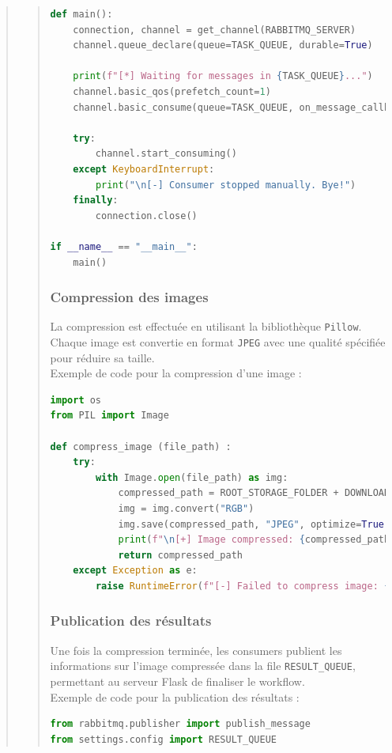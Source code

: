 \documentclass[12pt]{article}
\begin{document}
\begin{quote}
\begin{quote}
\begin{lstlisting}[language=Python]
def main():
    connection, channel = get_channel(RABBITMQ_SERVER)
    channel.queue_declare(queue=TASK_QUEUE, durable=True)

    print(f"[*] Waiting for messages in {TASK_QUEUE}...")
    channel.basic_qos(prefetch_count=1)
    channel.basic_consume(queue=TASK_QUEUE, on_message_callback=process_message)

    try:
        channel.start_consuming()
    except KeyboardInterrupt:
        print("\n[-] Consumer stopped manually. Bye!")
    finally:
        connection.close()

if __name__ == "__main__":
    main()
\end{lstlisting}

\subsubsection*{Compression des images}
La compression est effectuée en utilisant la bibliothèque \texttt{Pillow}. \\
Chaque image est convertie en format \texttt{JPEG} avec une qualité spécifiée pour réduire sa taille. \\

Exemple de code pour la compression d’une image : \\
\begin{lstlisting}[language=Python]
import os
from PIL import Image

def compress_image (file_path) :
    try:
        with Image.open(file_path) as img:
            compressed_path = ROOT_STORAGE_FOLDER + DOWNLOAD_FOLDER + f"compressed_{os.path.basename(file_path)}"
            img = img.convert("RGB")
            img.save(compressed_path, "JPEG", optimize=True, quality=85)
            print(f"\n[+] Image compressed: {compressed_path}\n")
            return compressed_path
    except Exception as e:
        raise RuntimeError(f"[-] Failed to compress image: {e}")
\end{lstlisting}

\subsubsection*{Publication des résultats}
Une fois la compression terminée, les consumers publient les informations sur l'image compressée dans la file \texttt{RESULT\_QUEUE}, permettant au serveur Flask de finaliser le workflow. \\

Exemple de code pour la publication des résultats : \\
\begin{lstlisting}[language=Python]
from rabbitmq.publisher import publish_message
from settings.config import RESULT_QUEUE


\end{lstlisting}
\end{quote}
\end{quote}
\end{document}
